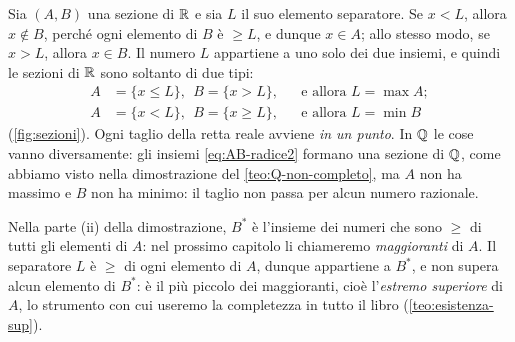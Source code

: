 \begin{marginfigure}
\centering
{}
\caption{Le due forme di una sezione di $\R$: il punto di taglio $L$ sta in $A$ (in
alto) oppure in $B$ (al centro). In basso, la sezione di $\Q$ della
\eqref{eq:AB-radice2}: il taglio cade in un «buco».}
\label{fig:sezioni}
\end{marginfigure}

\begin{esempio}\label{es:sezioni-R}
Sia $(A,B)$ una sezione di $\R$ e sia $L$ il suo elemento separatore. Se $x<L$, allora
$x\notin B$, perché ogni elemento di $B$ è $\ge L$, e dunque $x\in A$; allo stesso modo,
se $x>L$, allora $x\in B$. Il numero $L$ appartiene a uno solo dei due insiemi, e quindi
le sezioni di $\R$ sono soltanto di due tipi:
\begin{align*}
  A&=\{x\le L\},\ \ B=\{x>L\}, && \text{e allora } L=\max A;\\
  A&=\{x<L\},\ \ B=\{x\ge L\}, && \text{e allora } L=\min B
\end{align*}
(\cref{fig:sezioni}). Ogni taglio della retta reale avviene \emph{in un punto}. In $\Q$
le cose vanno diversamente: gli insiemi \eqref{eq:AB-radice2} formano una sezione di
$\Q$, come abbiamo visto nella dimostrazione del \cref{teo:Q-non-completo}, ma $A$ non ha
massimo e $B$ non ha minimo: il taglio non passa per alcun numero razionale.
\end{esempio}

\begin{osservazione}
Nella parte (ii) della dimostrazione, $B^{*}$ è l'insieme dei numeri che sono $\ge$ di
tutti gli elementi di $A$: nel prossimo capitolo li chiameremo \emph{maggioranti} di $A$.
Il separatore $L$ è $\ge$ di ogni elemento di $A$, dunque appartiene a $B^{*}$, e non
supera alcun elemento di $B^{*}$: è il più piccolo dei maggioranti, cioè l'\emph{estremo
superiore} di $A$, lo strumento con cui useremo la completezza in tutto il libro
(\cref{teo:esistenza-sup}).
\end{osservazione}

